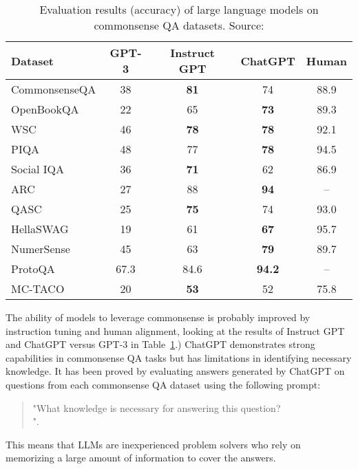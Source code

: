 \begin{table}[h!]
	\centering
	\small
	\begin{tabular}{|l|c|c|c|c|}
		\hline
		Dataset       & GPT-3 & Instruct GPT & ChatGPT       & Human \\
		\hline
		CommonsenseQA & 38    & \textbf{81}  & 74            & 88.9  \\
		OpenBookQA    & 22    & 65           & \textbf{73}   & 89.3  \\
		WSC           & 46    & \textbf{78}  & \textbf{78}   & 92.1  \\
		PIQA          & 48    & 77           & \textbf{78}   & 94.5  \\
		Social IQA    & 36    & \textbf{71}  & 62            & 86.9  \\
		ARC           & 27    & 88           & \textbf{94}   & --    \\
		QASC          & 25    & \textbf{75}  & 74            & 93.0  \\
		HellaSWAG     & 19    & 61           & \textbf{67}   & 95.7  \\
		NumerSense    & 45    & 63           & \textbf{79}   & 89.7  \\
		ProtoQA       & 67.3  & 84.6         & \textbf{94.2} & --    \\
		MC-TACO       & 20    & \textbf{53}  & 52            & 75.8  \\
		\hline
	\end{tabular}
	\caption{Evaluation results (accuracy) of large language models on commonsense QA datasets. Source: \textcite{bian2024chatgpt}}
	\label{tab:commonsense-results}
\end{table}
The ability of models to leverage commonsense is probably improved by instruction tuning and human alignment, looking at the results of Instruct GPT and ChatGPT versus GPT-3 in Table~\ref{tab:commonsense-results}.)
ChatGPT demonstrates strong capabilities in commonsense QA tasks but has limitations in identifying necessary knowledge.
It has been proved by evaluating answers generated by ChatGPT on questions from each commonsense QA dataset using the following prompt:
\begin{quote}
	"What knowledge is necessary for answering this question?\\
	".
\end{quote}
This means that LLMs are inexperienced problem solvers who rely on memorizing a large amount of information to cover the answers\cite{bian2024chatgpt}.
